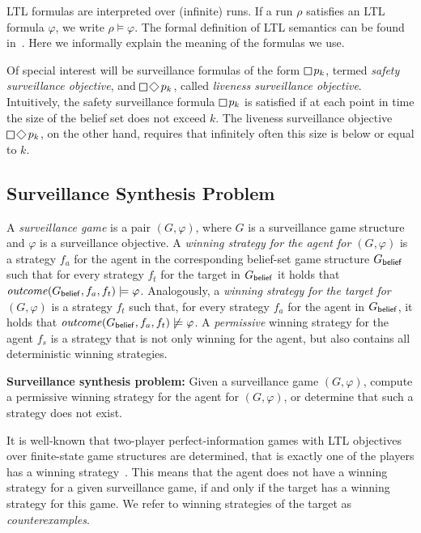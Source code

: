 LTL formulas are interpreted over (infinite) runs. If a run $\rho$ satisfies an LTL formula $\varphi$, we write $\rho \models \varphi$. The formal definition of LTL semantics can be found in~\cite{BaierKatoen08}. Here we informally explain the meaning of the formulas we use.

Of special interest will be surveillance formulas of the form $\LTLglobally p_k$, termed \emph{safety surveillance objective}, and $\LTLglobally\LTLfinally p_k$, called \emph{liveness surveillance objective}.
Intuitively, the safety surveillance formula $\LTLglobally p_k$ is satisfied if at each point in time the size of the belief set does not exceed $k$. The liveness surveillance objective $\LTLglobally\LTLfinally p_k$, on the other hand, requires that infinitely often this size is below or equal to $k$.


\subsection{Surveillance Synthesis Problem}
A \emph{surveillance game} is a pair $(G,\varphi)$, where $G$ is a surveillance game structure and $\varphi$ is a surveillance objective. A \emph{winning strategy for the agent for $(G,\varphi)$} is a strategy $f_a$ for the agent in the corresponding belief-set game structure $G_{\mathsf{belief}}$ such that for every strategy $f_t$ for the target in $G_{\mathsf{belief}}$ it holds that $\mathit{outcome}(G_{\mathsf{belief}},f_a,f_t) \models \varphi$. Analogously, a \emph{winning strategy for the target for $(G,\varphi)$} is a strategy $f_t$ such that, for every strategy $f_a$ for the agent in $G_{\mathsf{belief}}$, it holds that $\mathit{outcome}(G_{\mathsf{belief}},f_a,f_t) \not\models \varphi$.
A \emph{permissive} winning strategy for the agent $f_s$ is a strategy that is not only winning for the agent, but also contains all deterministic winning strategies.

{\bf Surveillance synthesis problem:} Given a surveillance game $(G,\varphi)$, compute a permissive winning strategy for the agent for $(G,\varphi)$, or determine that such a strategy does not exist.


It is well-known that two-player perfect-information games with LTL objectives over finite-state game structures are determined, that is exactly one of the players has a winning strategy~\cite{BorelDeterminacy}. This means that the agent does not have a winning strategy for a given surveillance game, if and only if the target has a winning strategy for this game. We refer to winning strategies of the target as \emph{counterexamples}.
